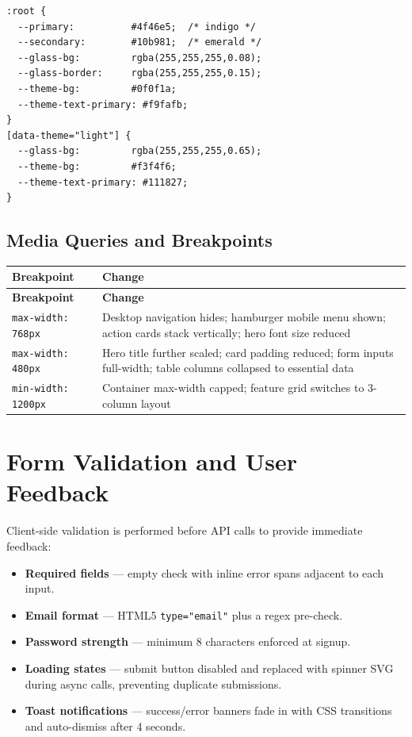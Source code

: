 \documentclass[12pt,a4paper]{report}
\begin{document}
\begin{lstlisting}[style=jsStyle, caption={CSS variables for theming}]
:root {
  --primary:          #4f46e5;  /* indigo */
  --secondary:        #10b981;  /* emerald */
  --glass-bg:         rgba(255,255,255,0.08);
  --glass-border:     rgba(255,255,255,0.15);
  --theme-bg:         #0f0f1a;
  --theme-text-primary: #f9fafb;
}
[data-theme="light"] {
  --glass-bg:         rgba(255,255,255,0.65);
  --theme-bg:         #f3f4f6;
  --theme-text-primary: #111827;
}
\end{lstlisting}

\subsection{Media Queries and Breakpoints}

\begin{longtable}{C{3cm} L{11cm}}
  \toprule
  \textbf{Breakpoint} & \textbf{Change} \\
  \midrule
  \endfirsthead
  \midrule
  \textbf{Breakpoint} & \textbf{Change} \\
  \midrule
  \endhead
  \bottomrule
  \endfoot
  \texttt{max-width: 768px}  & Desktop navigation hides; hamburger mobile menu shown; action cards stack vertically; hero font size reduced \\
  \texttt{max-width: 480px}  & Hero title further scaled; card padding reduced; form inputs full-width; table columns collapsed to essential data \\
  \texttt{min-width: 1200px} & Container max-width capped; feature grid switches to 3-column layout \\
\end{longtable}

\section{Form Validation and User Feedback}

Client-side validation is performed before API calls to provide immediate feedback:

\begin{itemize}
  \item \textbf{Required fields} — empty check with inline error spans adjacent to each input.
  \item \textbf{Email format} — HTML5 \texttt{type="email"} plus a regex pre-check.
  \item \textbf{Password strength} — minimum 8 characters enforced at signup.
  \item \textbf{Loading states} — submit button disabled and replaced with spinner SVG during
    async calls, preventing duplicate submissions.
  \item \textbf{Toast notifications} — success/error banners fade in with CSS transitions and
    auto-dismiss after 4 seconds.
\end{itemize}
\end{document}
